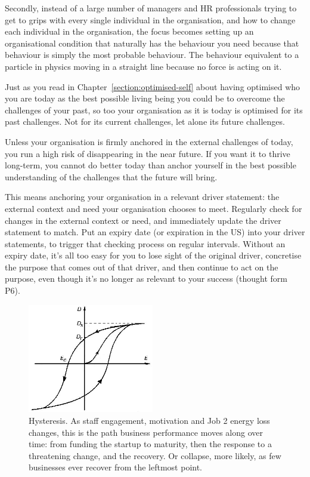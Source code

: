 Secondly, instead of a large number of managers and HR professionals trying to get to grips with every single individual in the organisation, and how to change each individual in the organisation, the focus becomes setting up an organisational condition that naturally has the behaviour you need because that behaviour is simply the most probable behaviour. The behaviour equivalent to a particle in physics moving in a straight line because no force is acting on it.


Just as you read in Chapter~\ref{section:optimised-self} about having optimised who you are today as the best possible living being you could be to overcome the challenges of your past, so too your organisation as it is today is optimised for its past challenges. Not for its current challenges, let alone its future challenges.


Unless your organisation is firmly anchored in the external challenges of today, you run a high risk of disappearing in the near future. If you want it to thrive long-term, you cannot do better today than anchor yourself in the best possible understanding of the challenges that the future will bring.


This means anchoring your organisation in a relevant driver statement: the external context and need your organisation chooses to meet. Regularly check for changes in the external context or need, and immediately update the driver statement to match. Put an expiry date (or expiration in the US) into your driver statements, to trigger that checking process on regular intervals. Without an expiry date, it's all too easy for you to lose sight of the original driver, concretise the purpose that comes out of that driver, and then continue to act on the purpose, even though it's no longer as relevant to your success (thought form P6).


\begin{figure}
\includegraphics[width=0.49\textwidth]{./Images/hysteresis}
\caption[Hysteresis. Business performance vs. staff engagement]{Hysteresis. As  staff engagement, motivation and Job 2 energy loss changes, this is the path business performance moves along over time: from funding the startup to maturity, then the response to a threatening change, and the recovery. Or collapse, more likely, as few businesses ever recover from the leftmost point. }\label{fig:hysteresis}
\end{figure}


